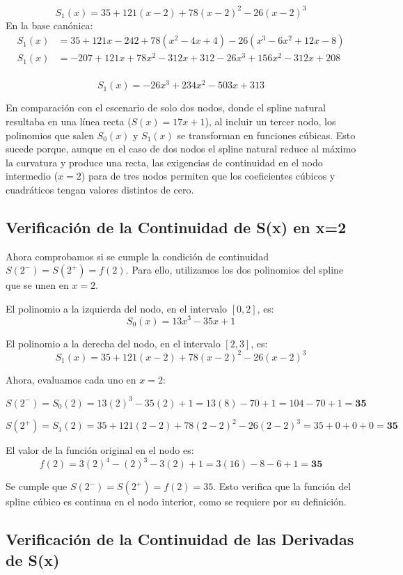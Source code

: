 \documentclass{article}
\begin{document}
$$ S_1(x) = 35 + 121(x-2) + 78(x-2)^2 - 26(x-2)^3 $$
En la base canónica:
\begin{align*}
    S_1(x) &= 35 + 121x - 242 + 78(x^2 - 4x + 4) - 26(x^3 - 6x^2 + 12x - 8) \\
    S_1(x) &= -207 + 121x + 78x^2 - 312x + 312 - 26x^3 + 156x^2 - 312x + 208 \\
\end{align*}

$$\boxed{S_1(x) = -26x^3 + 234x^2 - 503x + 313}$$


En comparación con el escenario de solo dos nodos, donde el spline natural resultaba en una línea recta (\(S(x) = 17x + 1\)), al incluir un tercer nodo, los polinomios que salen \(S_0(x)\) y \(S_1(x)\) se transforman en funciones cúbicas. Esto sucede porque, aunque en el caso de dos nodos el spline natural reduce al máximo la curvatura y produce una recta, las exigencias de continuidad en el nodo intermedio (\(x=2\)) para de tres nodos permiten que los coeficientes cúbicos y cuadráticos tengan valores distintos de cero.


\subsection{Verificación de la Continuidad de S(x) en x=2}

Ahora comprobamos si se cumple la condición de continuidad $S(2^-) = S(2^+) = f(2)$. Para ello, utilizamos los dos polinomios del spline que se unen en $x=2$.

El polinomio a la izquierda del nodo, en el intervalo $[0,2]$, es:
$$ S_0(x) = 13x^3 - 35x + 1 $$

El polinomio a la derecha del nodo, en el intervalo $[2,3]$, es:
$$ S_1(x) = 35 + 121(x-2) + 78(x-2)^2 - 26(x-2)^3 $$

Ahora, evaluamos cada uno en $x=2$:

$$ S(2^-) = S_0(2) = 13(2)^3 - 35(2) + 1 = 13(8) - 70 + 1 = 104 - 70 + 1 = \mathbf{35} $$

$$ S(2^+) = S_1(2) = 35 + 121(2-2) + 78(2-2)^2 - 26(2-2)^3 = 35 + 0 + 0 + 0 = \mathbf{35} $$

El valor de la función original en el nodo es:
$$ f(2) = 3(2)^4 - (2)^3 - 3(2) + 1 = 3(16) - 8 - 6 + 1 = \mathbf{35} $$

Se cumple que $S(2^-) = S(2^+) = f(2) = 35$. Esto verifica que la función del spline cúbico es continua en el nodo interior, como se requiere por su definición.

\subsection{Verificación de la Continuidad de las Derivadas de S(x)}
\end{document}
